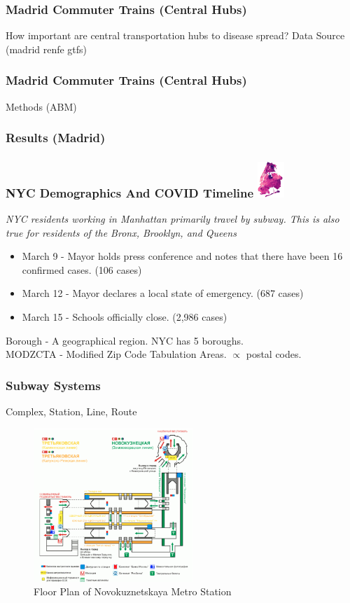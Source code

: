 \documentclass{beamer}
\begin{document}
\begin{frame}
\frametitle{Madrid Commuter Trains (Central Hubs)}
How important are central transportation hubs to disease spread?
Data Source (madrid renfe gtfs)
\end{frame}
\begin{frame}
\frametitle{Madrid Commuter Trains (Central Hubs)}
Methods (ABM)
\end{frame}
\begin{frame}
\frametitle{Results (Madrid)}
\end{frame}
\begin{frame}
\frametitle{NYC Demographics And COVID Timeline
\includegraphics[width=1cm]{Scratch_Visuals/NYC_COVID_Case_Rate.png}
}
\textit{NYC residents working in Manhattan primarily travel by subway. This is
also true for residents of the Bronx, Brooklyn, and Queens\cite{nyc_commuting}}
\begin{itemize}
	\item March 9 - Mayor holds press conference and notes that there have been 16 confirmed cases. (106 cases)
	\item March 12 - Mayor declares a local state of emergency. (687 cases)
	\item March 15 - Schools officially close. (2,986 cases)
\end{itemize}
Borough - A geographical region. NYC has 5 boroughs. \\
MODZCTA - Modified Zip Code Tabulation Areas. $\propto$ postal codes.\\
\end{frame}
\begin{frame}
\frametitle{Subway Systems}
Complex, Station, Line, Route
\begin{figure}
    \includegraphics[width=6cm]{Scratch_Visuals/Novokuznetskaya.png}
    \caption{Floor Plan of Novokuznetskaya Metro Station \cite{Novokuznetskaya}}
\end{figure}
\end{frame}
\end{document}
